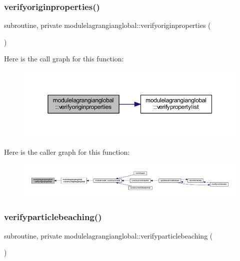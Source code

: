 \subsubsection{\texorpdfstring{verifyoriginproperties()}{verifyoriginproperties()}}
{\footnotesize\ttfamily subroutine, private modulelagrangianglobal\+::verifyoriginproperties (\begin{DoxyParamCaption}{ }\end{DoxyParamCaption})\hspace{0.3cm}{\ttfamily [private]}}

Here is the call graph for this function\+:\nopagebreak
\begin{figure}[H]
\begin{center}
\leavevmode
\includegraphics[width=350pt]{namespacemodulelagrangianglobal_a665e00ca13f06e06edf9476f18ec2b58_cgraph}
\end{center}
\end{figure}
Here is the caller graph for this function\+:\nopagebreak
\begin{figure}[H]
\begin{center}
\leavevmode
\includegraphics[width=350pt]{namespacemodulelagrangianglobal_a665e00ca13f06e06edf9476f18ec2b58_icgraph}
\end{center}
\end{figure}
\mbox{\label{namespacemodulelagrangianglobal_a2d56e0e16cf1181052cd535803200b87}} 
\subsubsection{\texorpdfstring{verifyparticlebeaching()}{verifyparticlebeaching()}}
{\footnotesize\ttfamily subroutine, private modulelagrangianglobal\+::verifyparticlebeaching (\begin{DoxyParamCaption}{ }\end{DoxyParamCaption})\hspace{0.3cm}{\ttfamily [private]}}

